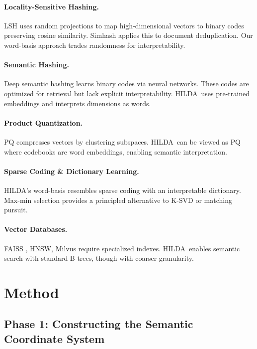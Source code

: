 \documentclass[11pt]{article}
\newcommand{\hilda}{\textsc{HILDA}}
\begin{document}
\paragraph{Locality-Sensitive Hashing.} LSH \cite{lsh_original} uses random projections to map high-dimensional vectors to binary codes preserving cosine similarity. Simhash \cite{simhash} applies this to document deduplication. Our word-basis approach trades randomness for interpretability.

\paragraph{Semantic Hashing.} Deep semantic hashing \cite{semantic_hashing} learns binary codes via neural networks. These codes are optimized for retrieval but lack explicit interpretability. \hilda\ uses pre-trained embeddings and interprets dimensions as words.

\paragraph{Product Quantization.} PQ \cite{jegou} compresses vectors by clustering subspaces. \hilda\ can be viewed as PQ where codebooks are word embeddings, enabling semantic interpretation.

\paragraph{Sparse Coding \& Dictionary Learning.} \hilda's word-basis resembles sparse coding with an interpretable dictionary. Max-min selection provides a principled alternative to K-SVD or matching pursuit.

\paragraph{Vector Databases.} FAISS \cite{faiss}, HNSW, Milvus require specialized indexes. \hilda\ enables semantic search with standard B-trees, though with coarser granularity.

\section{Method}

\subsection{Phase 1: Constructing the Semantic Coordinate System}
\end{document}
